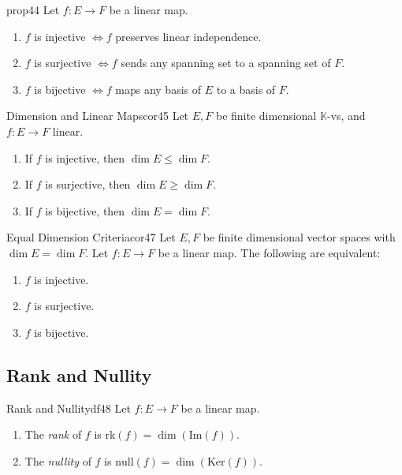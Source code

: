 \documentclass[11pt, a4paper]{article}
\newcommand{\K}{\mathbb{K}}
\begin{document}
\begin{proposition}{}{prop44}
  Let $f: E \to F$ be a linear map.
  \begin{enumerate}
    \item $f$ is injective $\iff f$ preserves linear independence.
    \item $f$ is surjective $\iff f$ sends any spanning set to a spanning set of $F$.
    \item $f$ is bijective $\iff f$ maps any basis of $E$ to a basis of $F$.
  \end{enumerate}
\end{proposition}

\begin{corollary}{Dimension and Linear Maps}{cor45}
  Let $E, F$ be finite dimensional $\K$-vs, and $f: E \to F$ linear.
  \begin{enumerate}
    \item If $f$ is injective, then $\dim E \le \dim F$.
    \item If $f$ is surjective, then $\dim E \ge \dim F$.
    \item If $f$ is bijective, then $\dim E = \dim F$.
  \end{enumerate}
\end{corollary}

\begin{corollary}{Equal Dimension Criteria}{cor47}
  Let $E, F$ be finite dimensional vector spaces with $\dim E = \dim F$. Let $f: E \to F$ be a linear map. The following are equivalent:
  \begin{enumerate}
    \item $f$ is injective.
    \item $f$ is surjective.
    \item $f$ is bijective.
  \end{enumerate}
\end{corollary}

\subsection{Rank and Nullity}

\begin{definition}{Rank and Nullity}{df48}
  Let $f: E \to F$ be a linear map.
  \begin{enumerate}
    \item The \emph{rank} of $f$ is $\text{rk}(f) = \dim(\text{Im}(f))$.
    \item The \emph{nullity} of $f$ is $\text{null}(f) = \dim(\text{Ker}(f))$.
  \end{enumerate}
\end{definition}
\end{document}

